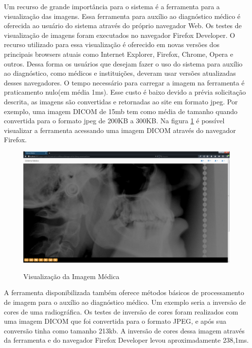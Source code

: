 Um recurso de grande importância para o sistema é a ferramenta para a visualização das imagens. Essa ferramenta para auxílio ao diagnóstico médico é oferecida ao usuário do 
sistema através do próprio navegador Web. Os testes de visualização de imagens foram executados no navegador Firefox Developer. O recurso utilizado para essa visualização é 
oferecido em novas versões dos principais browsers atuais como Internet Explorer, Firefox, Chrome, Opera e outros. Dessa forma os usuários que desejam fazer o uso do sistema 
para auxílio ao diagnóstico, como médicos e instituições, deveram usar versões atualizadas desses navegadores. O tempo necessário para carregar a imagem na ferramenta é
praticamento nulo(em média 1ms). Esse custo é baixo devido a prévia solicitação descrita, as imagens são convertidas e retornadas ao site em formato jpeg. Por exemplo, uma  imagem DICOM de 15mb tem como média de tamanho quando convertida para o formato jpeg de 200KB a 300KB. Na figura \ref{fig:figura4} é possível visualizar a ferramenta acessando uma imagem DICOM através do navegador Firefox.

\begin{figure}[ht]
	\centering	
	\caption[\hspace{0.1cm}Imagens Clínicas.]{Visualização da Imagem Médica}
	\vspace{-0.4cm}
	\includegraphics[width=1.0\textwidth]{figuras/visualizacaoImagemMedicaGrandeResolucao.png}
	\vspace{-0.2cm}
	\label{fig:figura4}
\end{figure}

A ferramenta disponibilizada também oferece métodos básicos de processamento de imagem para o auxílio ao diagnóstico médico. Um exemplo seria a inversão de cores de uma radiográfica. Os testes de inversão de cores foram realizados com uma imagem DICOM que foi convertida para o formato JPEG, e após sua conversão tinha como  tamanho 213kb. A inversão de cores dessa imagem através da ferramenta e do navegador Firefox Developer levou aproximadamente 238,1ms. 


